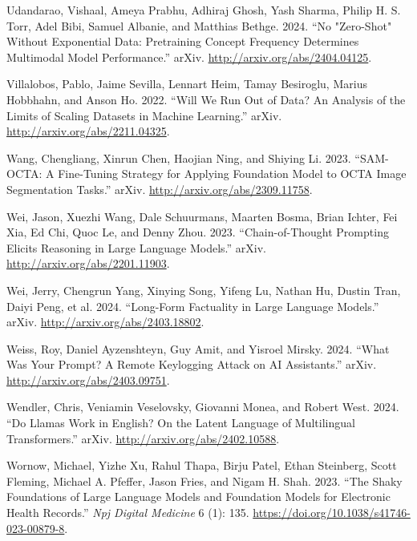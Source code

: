 \documentclass[
  Letterpaper,
]{scrbook}
\newlength{\cslhangindent}
\newenvironment{CSLReferences}[2] %
 {\begin{list}{}{%
  \setlength{\itemindent}{0pt}
  \setlength{\leftmargin}{0pt}
  \setlength{\parsep}{0pt}
  \ifodd #1
   \setlength{\leftmargin}{\cslhangindent}
   \setlength{\itemindent}{-1\cslhangindent}
  \fi
  \setlength{\itemsep}{#2\baselineskip}}}
 {\end{list}}
\begin{document}
\begin{CSLReferences}{1}{0}
Udandarao, Vishaal, Ameya Prabhu, Adhiraj Ghosh, Yash Sharma, Philip H.
S. Torr, Adel Bibi, Samuel Albanie, and Matthias Bethge. 2024. {``No
"{Zero}-{Shot}" {Without} {Exponential} {Data}: {Pretraining} {Concept}
{Frequency} {Determines} {Multimodal} {Model} {Performance}.''} arXiv.
\url{http://arxiv.org/abs/2404.04125}.

Villalobos, Pablo, Jaime Sevilla, Lennart Heim, Tamay Besiroglu, Marius
Hobbhahn, and Anson Ho. 2022. {``Will We Run Out of Data? {An} Analysis
of the Limits of Scaling Datasets in {Machine} {Learning}.''} arXiv.
\url{http://arxiv.org/abs/2211.04325}.

Wang, Chengliang, Xinrun Chen, Haojian Ning, and Shiying Li. 2023.
{``{SAM}-{OCTA}: {A} {Fine}-{Tuning} {Strategy} for {Applying}
{Foundation} {Model} to {OCTA} {Image} {Segmentation} {Tasks}.''} arXiv.
\url{http://arxiv.org/abs/2309.11758}.

Wei, Jason, Xuezhi Wang, Dale Schuurmans, Maarten Bosma, Brian Ichter,
Fei Xia, Ed Chi, Quoc Le, and Denny Zhou. 2023. {``Chain-of-{Thought}
{Prompting} {Elicits} {Reasoning} in {Large} {Language} {Models}.''}
arXiv. \url{http://arxiv.org/abs/2201.11903}.

Wei, Jerry, Chengrun Yang, Xinying Song, Yifeng Lu, Nathan Hu, Dustin
Tran, Daiyi Peng, et al. 2024. {``Long-Form Factuality in Large Language
Models.''} arXiv. \url{http://arxiv.org/abs/2403.18802}.

Weiss, Roy, Daniel Ayzenshteyn, Guy Amit, and Yisroel Mirsky. 2024.
{``What {Was} {Your} {Prompt}? {A} {Remote} {Keylogging} {Attack} on
{AI} {Assistants}.''} arXiv. \url{http://arxiv.org/abs/2403.09751}.

Wendler, Chris, Veniamin Veselovsky, Giovanni Monea, and Robert West.
2024. {``Do {Llamas} {Work} in {English}? {On} the {Latent} {Language}
of {Multilingual} {Transformers}.''} arXiv.
\url{http://arxiv.org/abs/2402.10588}.

Wornow, Michael, Yizhe Xu, Rahul Thapa, Birju Patel, Ethan Steinberg,
Scott Fleming, Michael A. Pfeffer, Jason Fries, and Nigam H. Shah. 2023.
{``The Shaky Foundations of Large Language Models and Foundation Models
for Electronic Health Records.''} \emph{Npj Digital Medicine} 6 (1):
135. \url{https://doi.org/10.1038/s41746-023-00879-8}.


\end{CSLReferences}
\end{document}
